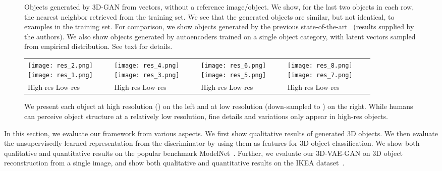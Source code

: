 \documentclass{article}
\newcommand{\model}{3D-GAN\xspace}
\newcommand{\vaemodel}{3D-VAE-GAN\xspace}
\begin{document}
\begin{figure}[t]
\caption{Objects generated by \model from vectors, without a reference image/object. We show, for the last two objects in each row, the nearest neighbor retrieved from the training set. We see that the generated objects are similar, but not identical, to examples in the training set. For comparison, we show objects generated by the previous state-of-the-art~\citep{wu20153d} (results supplied by the authors). We also show objects generated by autoencoders trained on a single object category, with latent vectors sampled from empirical distribution. See text for details. }

\label{fig:results}
\vspace{-12pt}
\end{figure}

\begin{figure}[t]
\centering
\begin{tabular}{C{0.22\linewidth}C{0.22\linewidth}C{0.22\linewidth}C{0.22\linewidth}}
\texttt{[image: res\_2.png]}
\texttt{[image: res\_1.png]}&
\texttt{[image: res\_4.png]}
\texttt{[image: res\_3.png]}&
\texttt{[image: res\_6.png]}
\texttt{[image: res\_5.png]}&
\texttt{[image: res\_8.png]}
\texttt{[image: res\_7.png]}\\
High-res \quad Low-res & High-res \quad Low-res & High-res \quad Low-res & High-res \quad Low-res 
\end{tabular}
\vspace{-5pt}
\caption{We present each object at high resolution () on the left and at low resolution (down-sampled to ) on the right. While humans can perceive object structure at a relatively low resolution, fine details and variations only appear in high-res objects.}
\vspace{-20pt}
\label{fig:nn}
\end{figure}

In this section, we evaluate our framework from various aspects. We first show qualitative results of generated 3D objects. We then evaluate the unsupervisedly learned representation from the discriminator by using them as features for 3D object classification. We show both qualitative and quantitative results on the popular benchmark ModelNet~\citep{wu20153d}. Further, we evaluate our \vaemodel on 3D object reconstruction from a single image, and show both qualitative and quantitative results on the IKEA dataset~\citep{ikea}. 
\end{document}
